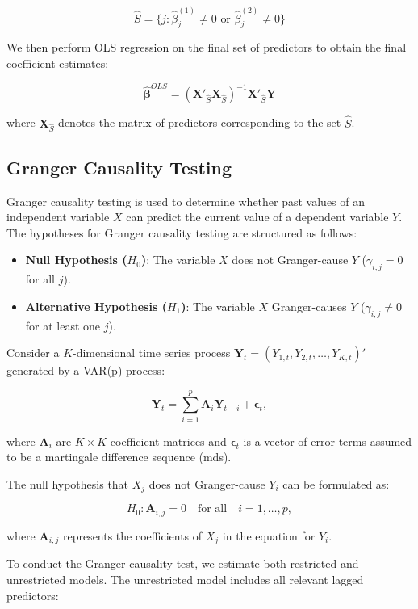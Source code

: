\documentclass[12pt]{article}
\begin{document}
\[
\hat{S} = \{ j : \hat{\beta}^{(1)}_j \neq 0 \text{ or } \hat{\beta}^{(2)}_j \neq 0 \}
\]

We then perform OLS regression on the final set of predictors to obtain the final coefficient estimates:

\[
\hat{\boldsymbol{\beta}}^{OLS} = (\mathbf{X}'_{\hat{S}} \mathbf{X}_{\hat{S}})^{-1} \mathbf{X}'_{\hat{S}} \mathbf{Y}
\]

where \(\mathbf{X}_{\hat{S}}\) denotes the matrix of predictors corresponding to the set \(\hat{S}\).



\subsection{Granger Causality Testing}

Granger causality testing is used to determine whether past values of an independent variable \(X\) can predict the current value of a dependent variable \(Y\). The hypotheses for Granger causality testing are structured as follows:

\begin{itemize}
    \item \textbf{Null Hypothesis (\(H_0\))}: The variable \(X\) does not Granger-cause \(Y\) (\(\gamma_{i,j} = 0\) for all \(j\)).
    \item \textbf{Alternative Hypothesis (\(H_1\))}: The variable \(X\) Granger-causes \(Y\) (\(\gamma_{i,j} \neq 0\) for at least one \(j\)).
\end{itemize}

Consider a \(K\)-dimensional time series process \(\mathbf{Y}_t = (Y_{1,t}, Y_{2,t}, \ldots, Y_{K,t})'\) generated by a VAR(p) process:

\[
\mathbf{Y}_t = \sum_{i=1}^{p} \mathbf{A}_i \mathbf{Y}_{t-i} + \boldsymbol{\epsilon}_t,
\]

where \(\mathbf{A}_i\) are \(K \times K\) coefficient matrices and \(\boldsymbol{\epsilon}_t\) is a vector of error terms assumed to be a martingale difference sequence (mds).

The null hypothesis that \(X_j\) does not Granger-cause \(Y_i\) can be formulated as:

\[
H_0: \mathbf{A}_{i,j} = 0 \quad \text{for all} \quad i = 1, \ldots, p,
\]

where \(\mathbf{A}_{i,j}\) represents the coefficients of \(X_j\) in the equation for \(Y_i\).

To conduct the Granger causality test, we estimate both restricted and unrestricted models. The unrestricted model includes all relevant lagged predictors:
\end{document}
